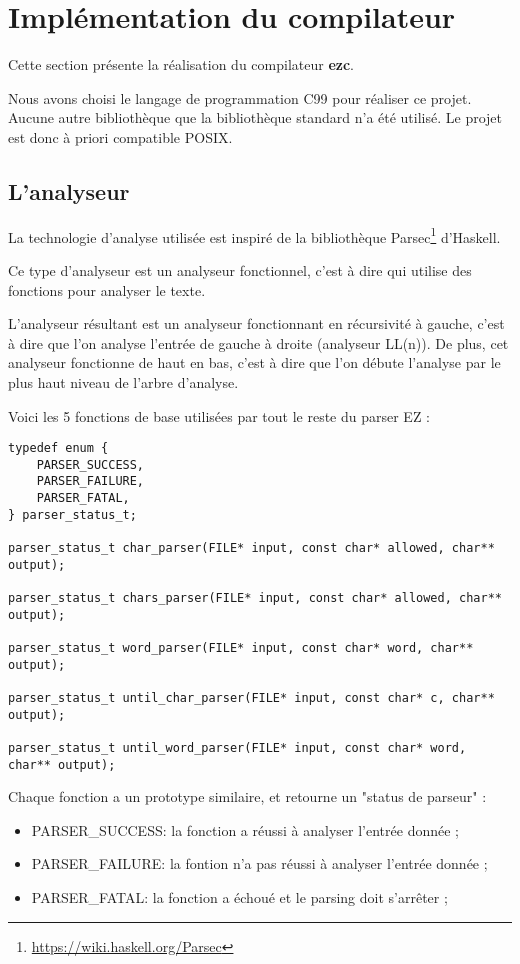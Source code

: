 \section{Implémentation du compilateur}

Cette section présente la réalisation du compilateur \textbf{ezc}.

Nous avons choisi le langage de programmation C99 pour réaliser ce projet.
Aucune autre bibliothèque que la bibliothèque standard n'a été utilisé. Le
projet est donc à priori compatible POSIX.

\subsection{L'analyseur}

La technologie d'analyse utilisée est inspiré de la bibliothèque
Parsec\footnote{\url{https://wiki.haskell.org/Parsec}} d'Haskell.

Ce type d'analyseur est un analyseur fonctionnel, c'est à dire qui utilise des
fonctions pour analyser le texte.

L'analyseur résultant est un analyseur fonctionnant en récursivité à gauche,
c'est à dire que l'on analyse l'entrée de gauche à droite (analyseur LL(n)).
De plus, cet analyseur fonctionne de haut en bas, c'est à dire que l'on débute
l'analyse par le plus haut niveau de l'arbre d'analyse.

Voici les 5 fonctions de base utilisées par tout le reste du parser EZ :
\begin{verbatim}
typedef enum {
    PARSER_SUCCESS,
    PARSER_FAILURE,
    PARSER_FATAL,
} parser_status_t;

parser_status_t char_parser(FILE* input, const char* allowed, char** output);

parser_status_t chars_parser(FILE* input, const char* allowed, char** output);

parser_status_t word_parser(FILE* input, const char* word, char** output);

parser_status_t until_char_parser(FILE* input, const char* c, char** output);

parser_status_t until_word_parser(FILE* input, const char* word, char** output);
\end{verbatim}
Chaque fonction a un prototype similaire, et retourne un "status de parseur" :
\begin{itemize}
    \item PARSER\_SUCCESS: la fonction a réussi à analyser l'entrée donnée ;
    \item PARSER\_FAILURE: la fontion n'a pas réussi à analyser l'entrée donnée ;
    \item PARSER\_FATAL: la fonction a échoué et le parsing doit s'arrêter ;
\end{itemize}

